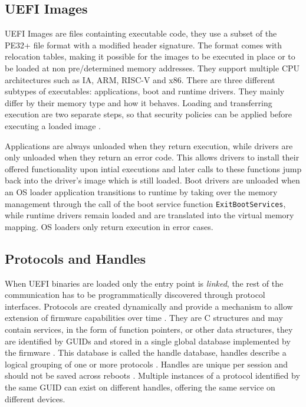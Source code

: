 \subsection{\acs{UEFI} Images}

\ac{UEFI} Images are files containting executable code, they use a subset of the \ac{PE32}+ file format with a modified header signature.
The format comes with relocation tables, making it possible for the images to be executed in place or to be loaded at non pre\-/determined memory addresses.
They support multiple CPU architectures such as IA, ARM, RISC-V and x86.
There are three different subtypes of executables: applications, boot and runtime drivers. They mainly differ by their memory type and how it behaves.
Loading and transferring execution are two separate steps, so that security policies can be applied before executing a loaded image \cite[Section 2.1.1]{uefi-spec}.

Applications are always unloaded when they return execution, while drivers are only unloaded when they return an error code. This allows drivers to install their offered functionality upon intial executions and later calls to these functions jump back into the driver's image which is still loaded.
Boot drivers are unloaded when an \ac{OS} loader application transitions to runtime by taking over the memory management through the call of the boot service function \lstinline{ExitBootServices}, while runtime drivers remain loaded and are translated into the virtual memory mapping. \ac{OS} loaders only return execution in error cases.


\subsection{Protocols and Handles}

When \ac{UEFI} binaries are loaded only the entry point is \emph{linked}, the rest of the communication has to be programmatically discovered through protocol interfaces.
Protocols are created dynamically and provide a mechanism to allow extension of firmware capabilities over time \cite[Section 3.6]{tianocore-edk2-driver-writer-s-guide}.
They are C structures and may contain services, in the form of function pointers, or other data structures, they are identified by \acp{GUID} and stored in a single global database implemented by the firmware \cite{beyond-bios}.
This database is called the handle database, handles describe a logical grouping of one or more protocols \cite[Section 3.6]{tianocore-edk2-driver-writer-s-guide}.
Handles are unique per session and should not be saved across reboots \cite{beyond-bios}.
Multiple instances of a protocol identified by the same \ac{GUID} can exist on different handles, offering the same service on different devices.

